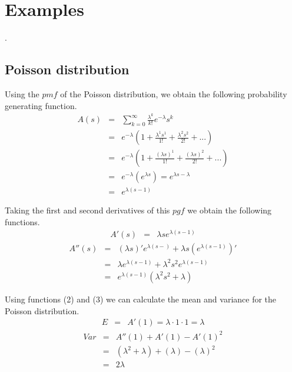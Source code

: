 \documentclass[a4paper, 10pt]{article}
\newcounter{prob_num}
\newcommand{\problem}{\vspace{20pt}\arabic{prob_num}.\stepcounter{prob_num}\par}
\begin{document}
\section*{Examples}
\problem

\subsection*{Poisson distribution}
Using the $pmf$ of the Poisson distribution, we obtain the following probability generating function.
\begin{eqnarray}
  A(s) &=& \sum_{k=0}^{\infty}\frac{\lambda^k}{k!}e^{-\lambda}s^k \nonumber \\
       &=& e^{-\lambda}\left( 1 + \frac{\lambda^1 s^1}{1!} + \frac{\lambda^2 s^2}{2!} + ... \right) \nonumber \\
       &=& e^{-\lambda}\left( 1 + \frac{(\lambda s)^1}{1!} + \frac{(\lambda s)^2}{2!} + ... \right) \nonumber \\
       &=& e^{-\lambda}\left( e^{\lambda s} \right) = e^{\lambda s - \lambda} \nonumber \\
       &=& e^{\lambda(s - 1)}
\end{eqnarray}

Taking the first and second derivatives of this $pgf$ we obtain the following functions.
\begin{eqnarray}
  A'(s) &=& \lambda s e^{\lambda(s - 1)}
\end{eqnarray}
\begin{eqnarray}
  A''(s) &=& (\lambda s)' e^{\lambda(s - )} + \lambda s (e^{\lambda(s - 1)})' \nonumber \\
         &=& \lambda e^{\lambda(s - 1)} + \lambda^2 s^2 e^{\lambda(s -1)}     \nonumber \\
         &=& e^{\lambda(s -1)} \left( \lambda^2 s^2 + \lambda \right)
\end{eqnarray}

Using functions (2) and (3) we can calculate the mean and variance for the Poisson distribution.
\begin{eqnarray}
  E &=& A'(1) = \lambda \cdot 1 \cdot 1 = \lambda
\end{eqnarray}
\begin{eqnarray}
  Var &=& A''(1) + A'(1) - A'(1)^2 \nonumber \\
      &=& (\lambda^2 + \lambda) + (\lambda) - (\lambda)^2 \nonumber \\
      &=& 2\lambda
\end{eqnarray}
\end{document}
